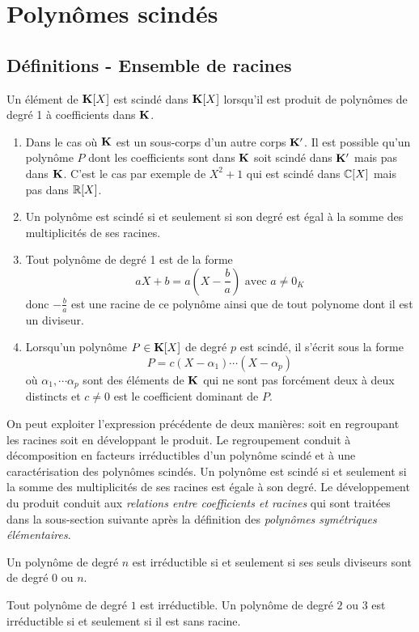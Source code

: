 \section{Polynômes scindés}
\subsection{Définitions - Ensemble de racines}
\begin{defi}
 Un élément de $\mathbf{K}[X]$ est scindé dans $\mathbf{K}[X]$ lorsqu'il est produit de polynômes de degré 1 à coefficients dans $\mathbf{K}$.
\end{defi}
\begin{rems}
\begin{enumerate}
 \item Dans le cas où $\mathbf{K}$ est un sous-corps d'un autre corps $\mathbf{K}^\prime$. Il est possible qu'un polynôme $P$ dont les coefficients sont dans $\mathbf{K}$ soit scindé dans $\mathbf{K}^\prime$ mais pas dans $\mathbf{K}$. C'est le cas par exemple de $X^2+1$ qui est scindé dans $\mathbb{C}[X]$ mais pas dans $\mathbb{R}[X]$.
\item Un polynôme est scindé si et seulement si son degré est égal à la somme des multiplicités de ses racines.
\item Tout polynôme de degré 1 est de la forme 
\begin{displaymath}
aX+b = a(X- \dfrac{b}{a}) \text{ avec } a\neq 0_K
\end{displaymath}
donc $-\frac{b}{a}$ est une racine de ce polynôme ainsi que de tout polynome dont il est un diviseur.
\item Lorsqu'un polynôme $P\in \mathbf{K}[X]$ de degré $p$ est scindé, il s'écrit sous la forme
\begin{equation}
 P = c(X-\alpha_1)\cdots (X-\alpha_p)
\end{equation}
où $\alpha_1, \cdots \alpha_p$ sont des éléments de $\mathbf{K}$ qui ne sont pas forcément deux à deux distincts et $c\neq0$ est le coefficient dominant de $P$.
\end{enumerate}
\end{rems}
 
On peut exploiter l'expression précédente de deux manières: soit en regroupant les racines soit en développant le produit.\newline
Le regroupement conduit à décomposition en facteurs irréductibles d'un polynôme scindé et à une caractérisation des polynômes scindés. Un polynôme est scindé si et seulement si la somme des multiplicités de ses racines est égale à son degré.\newline
Le développement du produit conduit aux \emph{relations entre coefficients et racines} qui sont traitées dans la sous-section suivante après la définition des \emph{polynômes symétriques élémentaires}.
\begin{defi}
 Un polynôme de degré $n$ est irréductible si et seulement si ses seuls diviseurs sont de degré $0$ ou $n$.
\end{defi}
Tout polynôme de degré $1$ est irréductible. Un polynôme de degré $2$ ou $3$ est irréductible si et seulement si il est sans racine.

